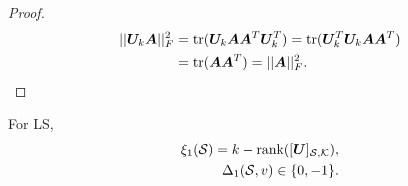 \begin{proof}
    \begin{align}
    ||\bm{U}_{k}\bm{A}||^{2}_{F} 
    &= \text{tr}(\bm{U}_{k}\bm{A}\bm{A}^{T}\bm{U}_{k}^{T})
    = \text{tr}(\bm{U}_{k}^{T}\bm{U}_{k}\bm{A}\bm{A}^{T}) \\
    &= \text{tr}(\bm{A}\bm{A}^{T}) = ||\bm{A}||^{2}_{F}.
\end{align}
\end{proof}
\fi
\begin{lemma}
    \label{lemma:LS_xi_1_is_rank}
    For LS, 
    \begin{align}
        \xi_{1}(\mathcal{S}) = k - \text{rank}([\bm{U}]_{\mathcal{S},\mathcal{K}}),\label{eq:Lemma_xi_1_is_rank:rk}\\
        \Delta_{1}(\mathcal{S},v) \in \{0, -1\} \label{eq:Lemma_xi_1_is_rank:discrete}.
    \end{align}
\end{lemma}
